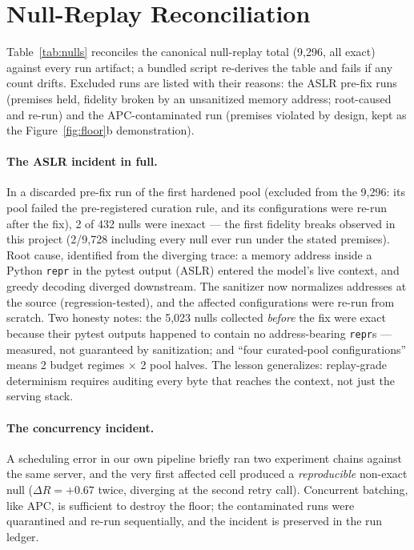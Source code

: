 \documentclass{article}
\theoremstyle{remark}
\begin{document}
\section{Null-Replay Reconciliation}
\label{app:nulls}
Table~\ref{tab:nulls} reconciles the canonical null-replay total
(9{,}296, all exact) against every run artifact; a bundled script
re-derives the table and fails if any count drifts. Excluded runs are
listed with their reasons: the ASLR pre-fix runs (premises held, fidelity
broken by an unsanitized memory address; root-caused and re-run) and the
APC-contaminated run (premises violated by design, kept as the
Figure~\ref{fig:floor}b demonstration).

\paragraph{The ASLR incident in full.} In a discarded pre-fix run of the
first hardened pool (excluded from the 9{,}296: its pool failed the
pre-registered curation rule, and its configurations were re-run after the
fix), 2 of 432 nulls were inexact --- the first fidelity breaks observed in
this project (2/9{,}728 including every null ever run under the stated
premises). Root cause, identified from the diverging trace: a memory
address inside a Python \texttt{repr} in the pytest output (ASLR) entered
the model's live context, and greedy decoding diverged downstream. The
sanitizer now normalizes addresses at the source (regression-tested), and
the affected configurations were re-run from scratch. Two honesty notes:
the 5{,}023 nulls collected \emph{before} the fix were exact because their
pytest outputs happened to contain no address-bearing \texttt{repr}s ---
measured, not guaranteed by sanitization; and ``four curated-pool
configurations'' means 2 budget regimes $\times$ 2 pool halves. The lesson
generalizes: replay-grade determinism requires auditing every byte that
reaches the context, not just the serving stack.

\paragraph{The concurrency incident.} A scheduling error in our own
pipeline briefly ran two experiment chains against the same server, and the
very first affected cell produced a \emph{reproducible} non-exact null
($\Delta R = +0.67$ twice, diverging at the second retry call). Concurrent
batching, like APC, is sufficient to destroy the floor; the contaminated
runs were quarantined and re-run sequentially, and the incident is
preserved in the run ledger.
\end{document}
